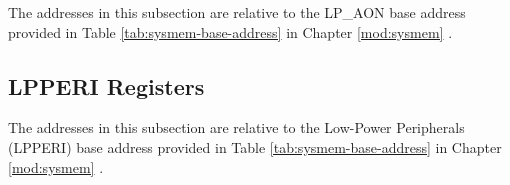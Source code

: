 \documentclass[main\_\_EN.tex]{subfiles}
\begin{document}
The addresses in this subsection are relative to the LP\_AON base address provided in Table \ref{tab:sysmem-base-address} in Chapter \ref{mod:sysmem} \textit{}.



\subsection{LPPERI Registers}
\label{sec:sysreg-reg-lpperi}

The addresses in this subsection are relative to the Low-Power Peripherals (LPPERI) base address provided in Table \ref{tab:sysmem-base-address} in Chapter \ref{mod:sysmem} \textit{}.


\end{document}
